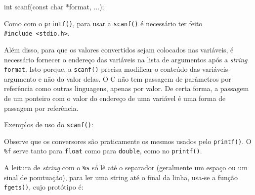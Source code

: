 \documentclass[
]{article}
\newenvironment{Shaded}{}{}
\newcommand{\CommentTok}[1]{\textcolor[rgb]{0.38,0.63,0.69}{\textit{#1}}}
\newcommand{\DataTypeTok}[1]{\textcolor[rgb]{0.56,0.13,0.00}{#1}}
\newcommand{\NormalTok}[1]{#1}
\newcommand{\StringTok}[1]{\textcolor[rgb]{0.25,0.44,0.63}{#1}}
\begin{document}
\begin{Shaded}
\begin{Highlighting}[]
\DataTypeTok{int}\NormalTok{ scanf(}\DataTypeTok{const} \DataTypeTok{char}\NormalTok{ *format, ...);}
\end{Highlighting}
\end{Shaded}

Como com o \texttt{printf()}, para usar a \texttt{scanf()} é necessário
ter feito \texttt{\#include\ \textless{}stdio.h\textgreater{}}.

Além disso, para que os valores convertidos sejam colocados nas
variáveis, é necessário fornecer o endereço das variáveis na lista de
argumentos após a \emph{string} \texttt{format}. Isto porque, a
\texttt{scanf()} precisa modificar o conteúdo das variáveis-argumento e
não do valor delas. O C não tem passagem de parâmetros por referência
como outras linguagens, apenas por valor. De certa forma, a passagem de
um ponteiro com o valor do endereço de uma variável é uma forma de
passagem por referência.

Exemplos de uso do \texttt{scanf()}:

\begin{Shaded}
\end{Shaded}

Observe que os conversores são praticamente os mesmos usados pelo
\texttt{printf()}. O \texttt{\%f} serve tanto para \texttt{float} como
para \texttt{double}, como no \texttt{printf()}.

A leitura de \emph{string} com o \texttt{\%s} só lê até o separador
(geralmente um espaço ou um sinal de pomtuação), para ler uma string até
o final da linha, usa-se a função \texttt{fgets()}, cujo protótipo é:
\end{document}
